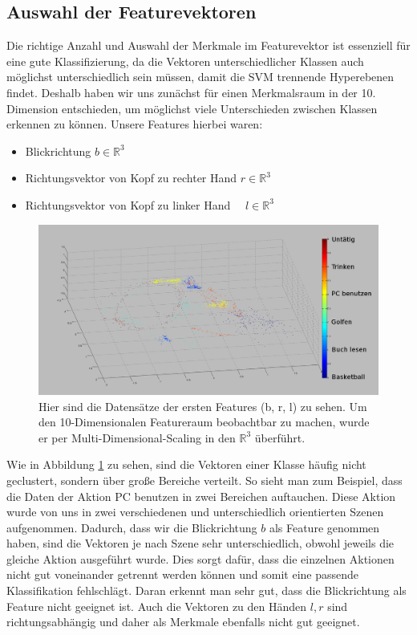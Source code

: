 \subsection{Auswahl der Featurevektoren}
\label{subsec:auswahl-der-feature-vektoren}
Die richtige Anzahl und Auswahl der Merkmale im Featurevektor ist essenziell für eine gute Klassifizierung, da die Vektoren unterschiedlicher Klassen auch möglichst unterschiedlich sein müssen, damit die SVM trennende Hyperebenen findet. Deshalb haben wir uns zunächst für einen Merkmalsraum in der 10. Dimension entschieden, um möglichst viele Unterschieden zwischen Klassen erkennen zu können. Unsere Features hierbei waren:
\begin{itemize}
    \item Blickrichtung \qquad\qquad\qquad\qquad\qquad\qquad\qquad$b \in \mathbb{R}^3$
    \item Richtungsvektor von Kopf zu rechter Hand \quad $r \in \mathbb{R}^3$    
    \item Richtungsvektor von Kopf zu linker Hand \ \ \quad $l \in \mathbb{R}^3$
\end{itemize}
\begin{figure}[hbtp]
\includegraphics[width=1.0\linewidth]{OldFeatures.png}
\caption{Hier sind die Datensätze der ersten Features (b, r, l) zu sehen. Um den 10-Dimensionalen Featureraum beobachtbar zu machen, wurde er per Multi-Dimensional-Scaling in den $\mathbb{R}^3$ überführt.}
\label{fig:Old-Features}
\end{figure}
Wie in Abbildung \ref{fig:Old-Features} zu sehen, sind die Vektoren einer Klasse häufig nicht geclustert, sondern über große Bereiche verteilt. So sieht man zum Beispiel, dass die Daten der Aktion \glqq{}PC benutzen\grqq{} in zwei Bereichen auftauchen. Diese Aktion wurde von uns in zwei verschiedenen und unterschiedlich orientierten Szenen aufgenommen. Dadurch, dass wir die Blickrichtung $b$ als Feature genommen haben, sind die Vektoren je nach Szene sehr unterschiedlich, obwohl jeweils die gleiche Aktion ausgeführt wurde. Dies sorgt dafür, dass die einzelnen Aktionen nicht gut voneinander getrennt werden können und somit eine passende Klassifikation fehlschlägt. Daran erkennt man sehr gut, dass die Blickrichtung als Feature nicht geeignet ist. Auch die Vektoren zu den Händen $l,r$ sind richtungsabhängig und daher als Merkmale ebenfalls nicht gut geeignet.\\
